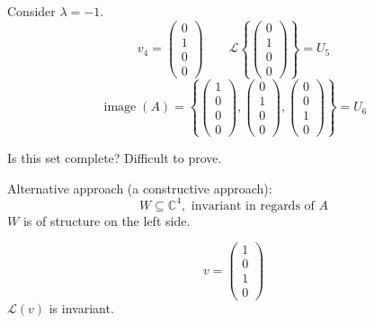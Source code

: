 \documentclass[a4paper]{article}
\theoremstyle{definition}
\DeclareMathOperator\image{image}
\newcommand\set[1]{\left\{#1\right\}}
\begin{document}
Consider $\lambda = -1$.
\[ v_4 = \begin{pmatrix} 0 \\ 1 \\ 0 \\ 0 \end{pmatrix} \qquad \mathcal L\set{\begin{pmatrix} 0 \\ 1 \\ 0 \\ 0 \end{pmatrix}} = U_5 \]
\[ \image(A) = \set{\begin{pmatrix} 1 \\ 0 \\ 0 \\ 0 \end{pmatrix}, \begin{pmatrix} 0 \\ 1 \\ 0 \\ 0 \end{pmatrix}, \begin{pmatrix} 0 \\ 0 \\ 1 \\ 0 \end{pmatrix}} = U_6 \]

Is this set complete?
Difficult to prove.


Alternative approach (a constructive approach):
\[ W \subseteq \mathbb C^4, \text{ invariant in regards of } A \]
$W$ is of structure on the left side.

\[ v = \begin{pmatrix} 1 \\ 0 \\ 1 \\ 0 \end{pmatrix} \]
$\mathcal L(v)$ is invariant.
\end{document}
